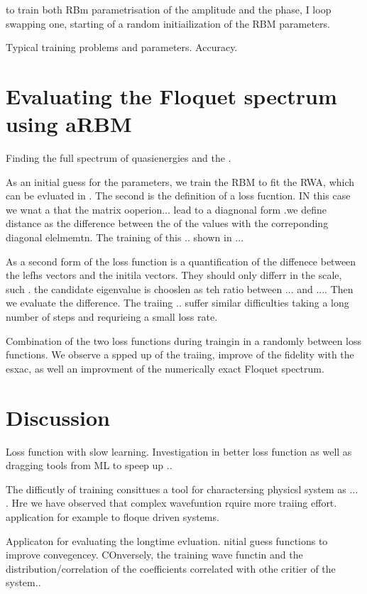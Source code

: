 \documentclass[pra,twocolumn,showkeys,preprintnumbers, amsmath,amssymb, aps,A4paper]{revtex4-1}
\begin{document}
\begin{equaiton}
\begin{equaiton}
to train both RBm parametrisation of the amplitude and the phase, I loop swapping one, starting of a random initiailization of the RBM parameters. 

Typical training problems and parameters. Accuracy. 



\section{\label{sec:RBMFloquetSpectrum} Evaluating the Floquet spectrum using aRBM}

Finding the full spectrum of quasienergies and the .

As an initial guess for the parameters, we train the RBM to fit the RWA, which can be evluated in . The second is the definition of a loss fucntion. IN this case we wnat a that the matrix ooperion... lead to a diagnonal form .we define distance as the difference between the of the values with the correponding diagonal elelmemtn. The training of this ..  shown in ...

As a second form of the loss function is a quantification of the diffenece between the lefhs vectors and the initila vectors. They should only differr in the scale, such . the candidate eigenvalue is chooslen as teh ratio between ... and .... Then we evaluate the difference.  The traiing .. suffer similar difficulties taking a long number of steps and requrieing a small loss rate. 


Combination of the two loss functions during traingin in a randomly between loss functions. We observe a spped up of the traiing, improve of the fidelity with the esxac, as well an improvment of the numerically exact Floquet spectrum.




\section{\label{sec:discussion} Discussion}

Loss function with slow learning. Investigation in better loss function as well as dragging tools from ML to speep up .. 

The difficutly of training consittues a tool for charactersing physicsl system as ... . Hre we have observed that complex wavefuntion rquire more traiing effort. application for example to floque driven systems.

Applicaton for evaluating the longtime evluation. nitial guess functions to improve convegencey. COnversely, the training wave functin and the distribution/correlation of the coefficients correlated with othe critier of the system..


\end{equaiton}
\end{equaiton}
\end{document}
